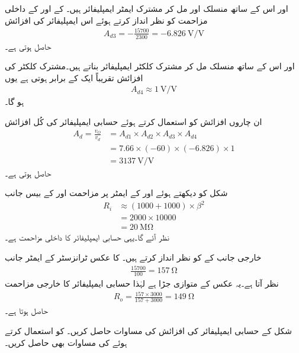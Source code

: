  اور اس کے ساتھ منسلک  اور  مل کر مشترک ایمٹر ایمپلیفائر ہیں۔ کے  اور  کے داخلی مزاحمت کو نظر انداز کرتے ہوئے اس ایمپلیفائر کی افزائش
\begin{align*}
A_{d3}=-\frac{15700}{2300}=\SI{-6.826}{\volt \per \volt}
\end{align*}
حاصل ہوتی ہے۔

 اور اس کے ساتھ منسلک  مل کر مشترک کلکٹر ایمپلیفائر بناتے ہیں۔مشترک کلکٹر کی افزائش تقریباً ایک کے برابر ہوتی ہے یوں
\begin{align*}
A_{d4} \approx \SI{1}{\volt \per \volt}
\end{align*}
ہو گا۔

ان چاروں افزائش کو استعمال کرتے ہوئے حسابی ایمپلیفائر کی کُل افزائش
\begin{align*}
A_d=\frac{v_O}{v_d}&=A_{d1} \times A_{d2} \times  A_{d3} \times A_{d4}\\
&=7.66 \times \left(-60\right) \times \left(-6.826 \right) \times 1\\
&=\SI{3137}{\volt \per \volt}
\end{align*}
حاصل ہوتی ہے۔

شکل   کو دیکھتے ہوئے  اور  کے ایمٹر پر  مزاحمت  اور  کے بیس جانب
\begin{align*}
R_i & \approx \left(1000+1000 \right) \times \beta^2\\
&=2000 \times 10000\\
&=\SI{20}{\mega \ohm}
\end{align*}
نظر آئے گا۔یہی حسابی ایمپلیفائر کا داخلی مزاحمت ہے۔

خارجی جانب  کے  کو نظر انداز کرتے ہیں۔ کا عکس ٹرانزسٹر کے ایمٹر جانب 
\begin{align*}
\frac{15700}{100}=\SI{157}{\ohm}
\end{align*}
نظر آتا ہے۔یہ عکس  کے متوازی جڑا ہے لہٰذا حسابی ایمپلیفائر کا خارجی مزاحمت
\begin{align*}
R_o=\frac{157 \times 3000}{157+3000} =\SI{149}{\ohm}
\end{align*}
حاصل ہوتا ہے۔

شکل  کے حسابی ایمپلیفائر کی افزائش  کی مساوات حاصل کریں۔ کو استعمال کرتے ہوئے  کی مساوات بھی حاصل کریں۔


